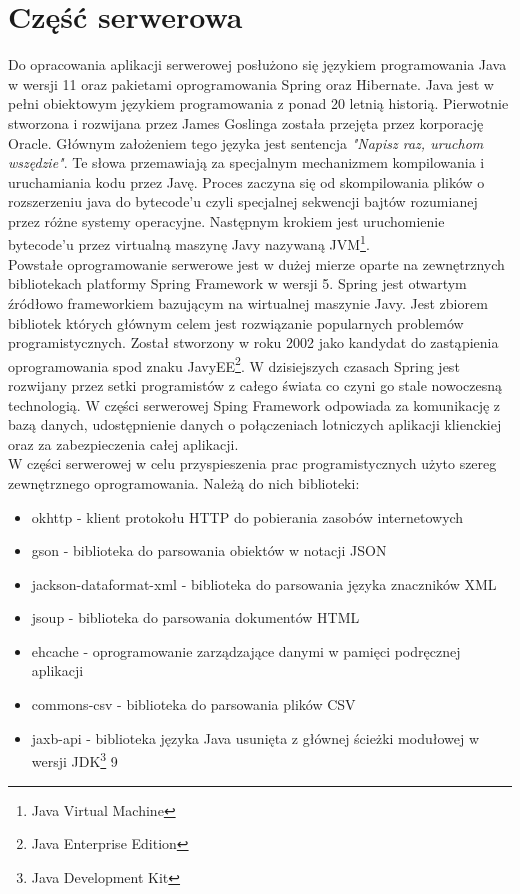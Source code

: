 \documentclass[12pt, twoside]{report}
\begin{document}
\section{Część serwerowa}
Do opracowania aplikacji serwerowej posłużono się językiem programowania Java w wersji 11 oraz pakietami oprogramowania Spring oraz Hibernate. Java jest w pełni obiektowym językiem programowania z ponad 20 letnią historią. Pierwotnie stworzona i rozwijana przez James Goslinga została przejęta przez korporację Oracle. Głównym założeniem tego języka jest sentencja \textit{"Napisz raz, uruchom wszędzie"}. Te słowa przemawiają za specjalnym mechanizmem kompilowania i uruchamiania kodu przez Javę. Proces zaczyna się od skompilowania plików o rozszerzeniu java do bytecode'u czyli specjalnej sekwencji bajtów rozumianej przez różne systemy operacyjne. Następnym krokiem jest uruchomienie bytecode'u przez virtualną maszynę Javy nazywaną JVM\footnote{Java Virtual Machine}.\cite{jvm} \\ \indent
Powstałe oprogramowanie serwerowe jest w dużej mierze oparte na zewnętrznych bibliotekach platformy Spring Framework w wersji 5. Spring jest otwartym źródłowo frameworkiem bazującym na wirtualnej maszynie Javy. Jest zbiorem bibliotek których głównym celem jest rozwiązanie popularnych problemów programistycznych. Został stworzony w roku 2002 jako kandydat do zastąpienia oprogramowania spod znaku JavyEE\footnote{Java Enterprise Edition}. W dzisiejszych czasach Spring jest rozwijany przez setki programistów z całego świata co czyni go stale nowoczesną technologią. W części serwerowej Sping Framework odpowiada za komunikację z bazą danych, udostępnienie danych o połączeniach lotniczych aplikacji klienckiej oraz za zabezpieczenia całej aplikacji. \\ \indent
W części serwerowej w celu przyspieszenia prac programistycznych użyto szereg zewnętrznego oprogramowania. Należą do nich biblioteki:
\begin{itemize}[noitemsep,topsep=0pt]
\item okhttp - klient protokołu HTTP do pobierania zasobów internetowych
\item gson - biblioteka do parsowania obiektów w notacji JSON
\item jackson-dataformat-xml - biblioteka do parsowania języka znaczników XML
\item jsoup - biblioteka do parsowania dokumentów HTML
\item ehcache - oprogramowanie zarządzające danymi w pamięci podręcznej aplikacji
\item commons-csv - biblioteka do parsowania plików CSV
\item jaxb-api - biblioteka języka Java usunięta z głównej ścieżki modułowej w wersji JDK\footnote{Java Development Kit} 9  
\end{itemize}
\end{document}
